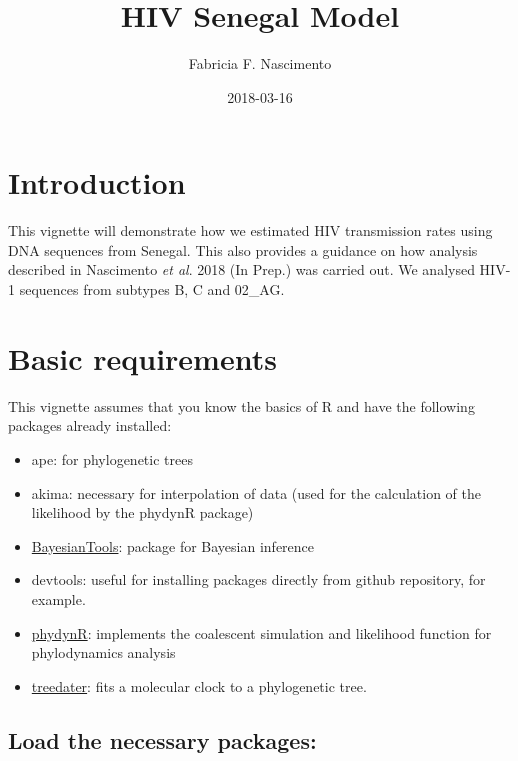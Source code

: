 \documentclass[12pt,]{article}
\title{HIV Senegal Model}
\author{Fabricia F. Nascimento}
\date{2018-03-16}
\providecommand{\tightlist}{%
  \setlength{\itemsep}{0pt}\setlength{\parskip}{0pt}}
\begin{document}
\maketitle

\hypertarget{introduction}{%
\section{Introduction}\label{introduction}}

This vignette will demonstrate how we estimated HIV transmission rates
using DNA sequences from Senegal. This also provides a guidance on how
analysis described in Nascimento \emph{et al}. 2018 (In Prep.) was
carried out. We analysed HIV-1 sequences from subtypes B, C and 02\_AG.

\hypertarget{basic-requirements}{%
\section{Basic requirements}\label{basic-requirements}}

This vignette assumes that you know the basics of R and have the
following packages already installed:

\begin{itemize}
\tightlist
\item
  ape: for phylogenetic trees
\item
  akima: necessary for interpolation of data (used for the calculation
  of the likelihood by the phydynR package)
\item
  \href{\%22https://github.com/florianhartig/BayesianTools\%22}{BayesianTools}:
  package for Bayesian inference
\item
  devtools: useful for installing packages directly from github
  repository, for example.
\item
  \href{\%22https://github.com/emvolz-phylodynamics/phydynR\%22}{phydynR}:
  implements the coalescent simulation and likelihood function for
  phylodynamics analysis
\item
  \href{\%22https://github.com/emvolz/treedater\%22}{treedater}: fits a
  molecular clock to a phylogenetic tree.
\end{itemize}

\hypertarget{load-the-necessary-packages}{%
\subsection{Load the necessary
packages:}\label{load-the-necessary-packages}}
\end{document}
